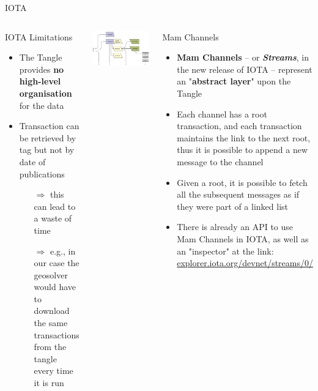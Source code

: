 \begin{frame}{IOTA}
    \begin{columns}[T]
        \begin{block}{IOTA Limitations}
            \begin{itemize}
                \item The Tangle provides \textbf{no high-level organisation} for the data
                \item Transaction can be retrieved by tag but not by date of publications
                \begin{itemize}
                    \item [$\Rightarrow$] this can lead to a waste of time
                    \item [$\Rightarrow$] e.g., in our case the geosolver would have to download the same transactions from the tangle every time it is run
                \end{itemize}
            \end{itemize}
        \end{block}
        \centering
        \includegraphics[width=\linewidth]{images/mam.png}
    
        \begin{block}{Mam Channels}
            \begin{itemize}
                \item \textbf{Mam Channels} -- or \textit{\textbf{Streams}}, in the new release of IOTA -- represent an "\textbf{abstract layer}" upon the Tangle
                \item Each channel has a root transaction, and each transaction maintains the link to the next root, thus it is possible to append a new message to the channel
                \item Given a root, it is possible to fetch all the subsequent messages as if they were part of a linked list
                \item There is already an API to use Mam Channels in IOTA, as well as an "inspector" at the link: \url{explorer.iota.org/devnet/streams/0/}
            \end{itemize}
        \end{block}
    \end{columns}
\end{frame}

